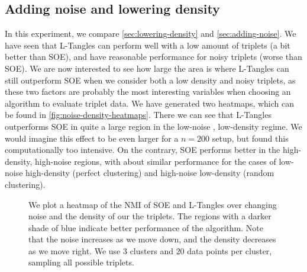 \subsection{Adding noise and lowering density}
In this experiment, we compare \autoref{sec:lowering-density} and \autoref{sec:adding-noise}. We have seen that L-Tangles can perform well with a low
amount of triplets (a bit better than SOE), and have reasonable performance for noisy triplets (worse than SOE). We are now interested to see how large the area is
where L-Tangles can still outperform SOE when we consider both a low density and noisy triplets, as these two factors are probably the most interesting variables
when choosing an algorithm to evaluate triplet data. We have generated two heatmaps, which can be found in \autoref{fig:noise-density-heatmaps}. 
There we can see that L-Tangles outperforms SOE in quite a large region in the low-noise , low-density regime. We would imagine this effect to be even larger
for a $n=200$ setup, but found this computationally too intensive. On the contrary, SOE performs better in the high-density, high-noise regions, with about similar performance
for the cases of low-noise high-density (perfect clustering) and high-noise low-density (random clustering).

\onecolumn
\begin{figure}[ht]
    \centering
    \caption{
        We plot a heatmap of the NMI of SOE and L-Tangles over changing noise and the density of our the triplets. 
        The regions with a darker shade of blue indicate better performance of the algorithm. 
        Note that the noise increases as we move down, and the
        density decreases as we move right.  We use $3$ clusters and $20$ data points per cluster, sampling all possible triplets. 
    }
    \label{fig:noise-density-heatmaps}
\end{figure}

